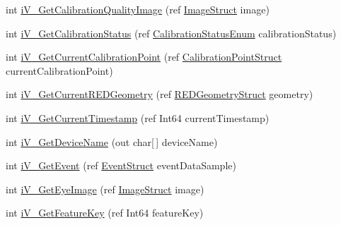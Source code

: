 \begin{DoxyCompactItemize}
\item 
int \hyperlink{class_web_analyzer_1_1_eye_tracking_1_1_eye_tracking_controller_ae94480a4dbad3f7d49c5315171e5a72e}{i\+V\+\_\+\+Get\+Calibration\+Quality\+Image} (ref \hyperlink{struct_web_analyzer_1_1_eye_tracking_1_1_eye_tracking_controller_1_1_image_struct}{Image\+Struct} image)
\item 
int \hyperlink{class_web_analyzer_1_1_eye_tracking_1_1_eye_tracking_controller_a6bc05991482fa6c72a273610fffc512c}{i\+V\+\_\+\+Get\+Calibration\+Status} (ref \hyperlink{class_web_analyzer_1_1_eye_tracking_1_1_eye_tracking_controller_a22313637b693bb7b9fd30e2d549c3eeb}{Calibration\+Status\+Enum} calibration\+Status)
\item 
int \hyperlink{class_web_analyzer_1_1_eye_tracking_1_1_eye_tracking_controller_a2faf624f65dbfbeed059545d58901680}{i\+V\+\_\+\+Get\+Current\+Calibration\+Point} (ref \hyperlink{struct_web_analyzer_1_1_eye_tracking_1_1_eye_tracking_controller_1_1_calibration_point_struct}{Calibration\+Point\+Struct} current\+Calibration\+Point)
\item 
int \hyperlink{class_web_analyzer_1_1_eye_tracking_1_1_eye_tracking_controller_a3b2c1ec6d3ed5cefe788937f1aaaa768}{i\+V\+\_\+\+Get\+Current\+R\+E\+D\+Geometry} (ref \hyperlink{struct_web_analyzer_1_1_eye_tracking_1_1_eye_tracking_controller_1_1_r_e_d_geometry_struct}{R\+E\+D\+Geometry\+Struct} geometry)
\item 
int \hyperlink{class_web_analyzer_1_1_eye_tracking_1_1_eye_tracking_controller_a03104a5a59f13194ae628b71bc7ea8ff}{i\+V\+\_\+\+Get\+Current\+Timestamp} (ref Int64 current\+Timestamp)
\item 
int \hyperlink{class_web_analyzer_1_1_eye_tracking_1_1_eye_tracking_controller_a20c20665b2973e16cded40111a157eda}{i\+V\+\_\+\+Get\+Device\+Name} (out char\mbox{[}$\,$\mbox{]} device\+Name)
\item 
int \hyperlink{class_web_analyzer_1_1_eye_tracking_1_1_eye_tracking_controller_aae1e52bcfe12aae67dbc9a1482492c17}{i\+V\+\_\+\+Get\+Event} (ref \hyperlink{struct_web_analyzer_1_1_eye_tracking_1_1_eye_tracking_controller_1_1_event_struct}{Event\+Struct} event\+Data\+Sample)
\item 
int \hyperlink{class_web_analyzer_1_1_eye_tracking_1_1_eye_tracking_controller_a0d0ebafff882207b19b7f17c79fe43b5}{i\+V\+\_\+\+Get\+Eye\+Image} (ref \hyperlink{struct_web_analyzer_1_1_eye_tracking_1_1_eye_tracking_controller_1_1_image_struct}{Image\+Struct} image)
\item 
int \hyperlink{class_web_analyzer_1_1_eye_tracking_1_1_eye_tracking_controller_a65528184634300dff6f77e7fa988ab42}{i\+V\+\_\+\+Get\+Feature\+Key} (ref Int64 feature\+Key)

\end{DoxyCompactItemize}
